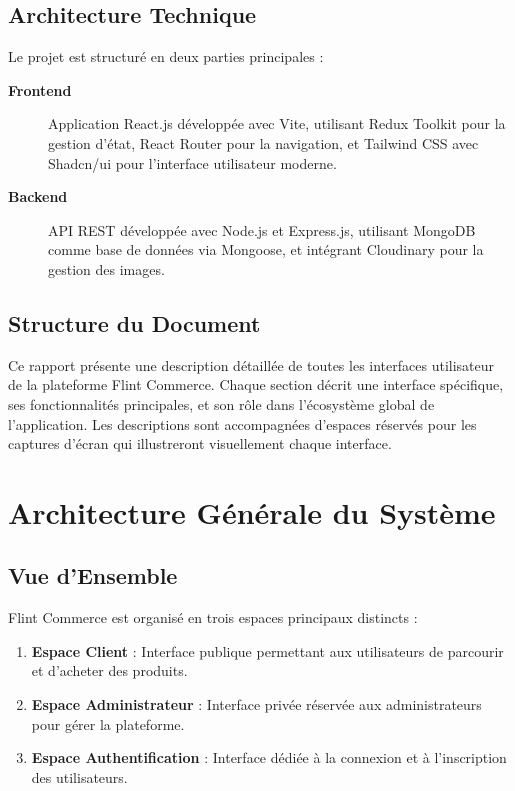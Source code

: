 \documentclass[12pt,a4paper]{article}
\begin{document}
\subsection{Architecture Technique}

Le projet est structuré en deux parties principales :

\begin{description}
    \item[\textbf{Frontend}] Application React.js développée avec Vite, utilisant Redux Toolkit pour la gestion d'état, React Router pour la navigation, et Tailwind CSS avec Shadcn/ui pour l'interface utilisateur moderne.
    
    \item[\textbf{Backend}] API REST développée avec Node.js et Express.js, utilisant MongoDB comme base de données via Mongoose, et intégrant Cloudinary pour la gestion des images.
\end{description}

\subsection{Structure du Document}

Ce rapport présente une description détaillée de toutes les interfaces utilisateur de la plateforme Flint Commerce. Chaque section décrit une interface spécifique, ses fonctionnalités principales, et son rôle dans l'écosystème global de l'application. Les descriptions sont accompagnées d'espaces réservés pour les captures d'écran qui illustreront visuellement chaque interface.

\newpage

\section{Architecture Générale du Système}

\subsection{Vue d'Ensemble}

Flint Commerce est organisé en trois espaces principaux distincts :

\begin{enumerate}
    \item \textbf{Espace Client} : Interface publique permettant aux utilisateurs de parcourir et d'acheter des produits.
    \item \textbf{Espace Administrateur} : Interface privée réservée aux administrateurs pour gérer la plateforme.
    \item \textbf{Espace Authentification} : Interface dédiée à la connexion et à l'inscription des utilisateurs.
\end{enumerate}
\end{document}
